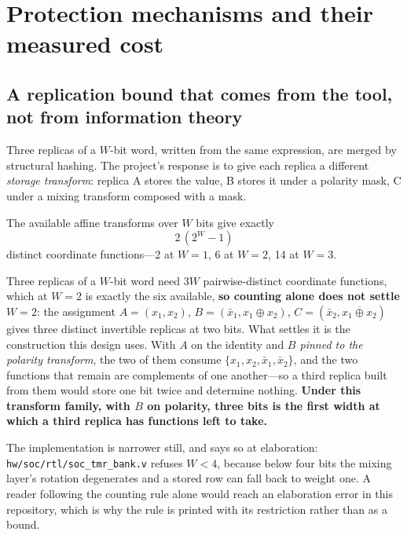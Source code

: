 \documentclass[11pt,a4paper]{article}
\newcommand{\file}[1]{\texttt{\small #1}}
\begin{document}
\section{Protection mechanisms and their measured cost}
\label{sec:mechanisms}

\subsection{A replication bound that comes from the tool, not from
information theory}

Three replicas of a $W$-bit word, written from the same expression, are
merged by structural hashing. The project's response is to give each
replica a different \emph{storage transform}: replica A stores the value,
B stores it under a polarity mask, C under a mixing transform composed
with a mask.

The available affine transforms over $W$ bits give exactly
\[
2\,(2^{W}-1)
\]
distinct coordinate functions---2 at $W=1$, 6 at $W=2$, 14 at $W=3$.

Three replicas of a $W$-bit word need $3W$ pairwise-distinct coordinate
functions, which at $W=2$ is exactly the six available, \textbf{so
counting alone does not settle $W=2$}: the assignment
$A=(x_1,x_2)$, $B=(\bar x_1, x_1\!\oplus\!x_2)$,
$C=(\bar x_2, \overline{x_1\!\oplus\!x_2})$ gives three distinct
invertible replicas at two bits. What settles it is the construction
this design uses. With $A$ on the identity and \emph{$B$ pinned to the
polarity transform}, the two of them consume
$\{x_1,x_2,\bar x_1,\bar x_2\}$, and the two functions that remain are
complements of one another---so a third replica built from them would
store one bit twice and determine nothing. \textbf{Under this transform
family, with $B$ on polarity, three bits is the first width at which a
third replica has functions left to take.}

The implementation is narrower still, and says so at elaboration:
\file{hw/soc/rtl/soc\_tmr\_bank.v} refuses $W<4$, because below four
bits the mixing layer's rotation degenerates and a stored row can fall
back to weight one. A reader following the counting rule alone would
reach an elaboration error in this repository, which is why the rule is
printed with its restriction rather than as a bound.
\end{document}
